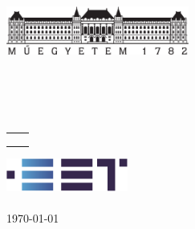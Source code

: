 \hypersetup{pageanchor=false}

\begin{titlepage}
\begin{center}
\includegraphics[width=60mm,keepaspectratio]{figures/bme_logo.pdf}\\
\vspace{0.3cm}
\textbf{\bme}\\
\textmd{\vik}\\
[5cm]

\vspace{0.4cm}
{\huge \bfseries \documentTitle}\\[0.8cm]
\vspace{0.5cm}
\textsc{\Large \documentDegree}\\[4cm]

{
	\renewcommand{\arraystretch}{0.85}
	\begin{tabular}{cc}
	 \makebox[7cm]{\emph{\madeBy}} & \makebox[7cm]{\emph{\consultant}} \\ \noalign{\smallskip}
	 \makebox[7cm]{\documentAuthor} & \makebox[7cm]{\consultantA} \\
	  & \makebox[7cm]{\consultantB} \\
	\end{tabular}
}

\vfill
\includegraphics[width=40mm,keepaspectratio]{figures/eetlogo.png}\\
\textbf{\department}\\
{\large \today}
\end{center}
\thispagestyle{empty}
\end{titlepage}
